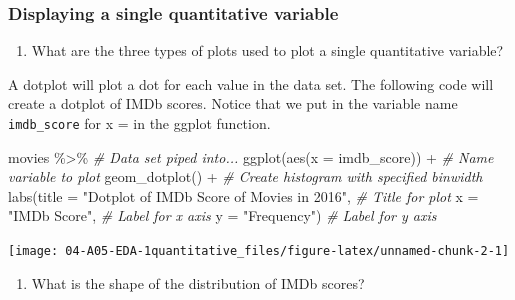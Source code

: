 \documentclass[
]{report}
\newenvironment{Shaded}{\begin{snugshade}}{\end{snugshade}}
\newcommand{\AttributeTok}[1]{\textcolor[rgb]{0.77,0.63,0.00}{#1}}
\newcommand{\CommentTok}[1]{\textcolor[rgb]{0.56,0.35,0.01}{\textit{#1}}}
\newcommand{\FunctionTok}[1]{\textcolor[rgb]{0.00,0.00,0.00}{#1}}
\newcommand{\NormalTok}[1]{#1}
\newcommand{\SpecialCharTok}[1]{\textcolor[rgb]{0.00,0.00,0.00}{#1}}
\newcommand{\StringTok}[1]{\textcolor[rgb]{0.31,0.60,0.02}{#1}}
\providecommand{\tightlist}{%
  \setlength{\itemsep}{0pt}\setlength{\parskip}{0pt}}
\begin{document}
\hypertarget{displaying-a-single-quantitative-variable}{%
\subsubsection*{Displaying a single quantitative variable}\label{displaying-a-single-quantitative-variable}}

\begin{enumerate}
\def\labelenumi{\arabic{enumi}.}
\setcounter{enumi}{6}
\tightlist
\item
  What are the three types of plots used to plot a single quantitative variable?
\end{enumerate}

\newpage

A dotplot will plot a dot for each value in the data set. The following code will create a dotplot of IMDb scores. Notice that we put in the variable name \texttt{imdb\_score} for x = in the ggplot function.

\begin{Shaded}
\begin{Highlighting}[]
\NormalTok{movies }\SpecialCharTok{\%\textgreater{}\%} \CommentTok{\# Data set piped into...}
\FunctionTok{ggplot}\NormalTok{(}\FunctionTok{aes}\NormalTok{(}\AttributeTok{x =}\NormalTok{ imdb\_score)) }\SpecialCharTok{+}   \CommentTok{\# Name variable to plot}
  \FunctionTok{geom\_dotplot}\NormalTok{() }\SpecialCharTok{+}  \CommentTok{\# Create histogram with specified binwidth}
  \FunctionTok{labs}\NormalTok{(}\AttributeTok{title =} \StringTok{"Dotplot of IMDb Score of Movies in 2016"}\NormalTok{, }\CommentTok{\# Title for plot}
       \AttributeTok{x =} \StringTok{"IMDb Score"}\NormalTok{, }\CommentTok{\# Label for x axis}
       \AttributeTok{y =} \StringTok{"Frequency"}\NormalTok{) }\CommentTok{\# Label for y axis}
\end{Highlighting}
\end{Shaded}

\begin{center}\texttt{[image: 04-A05-EDA-1quantitative\_files/figure-latex/unnamed-chunk-2-1]} \end{center}

\begin{enumerate}
\def\labelenumi{\arabic{enumi}.}
\setcounter{enumi}{7}
\tightlist
\item
  What is the shape of the distribution of IMDb scores?
\end{enumerate}
\end{document}
